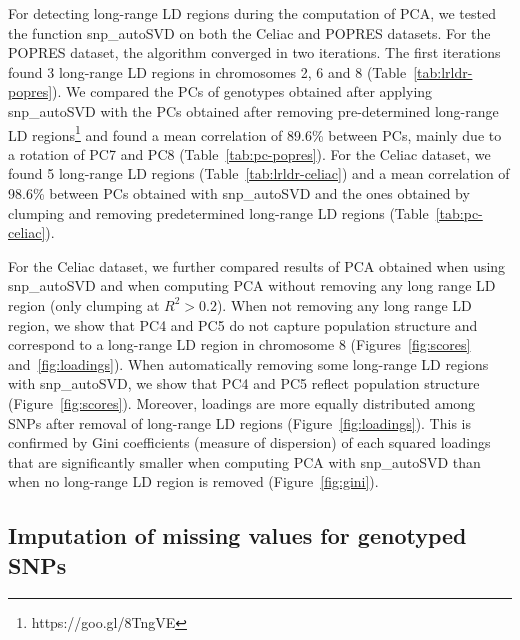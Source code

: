 \documentclass{bioinfo}
\begin{document}
For detecting long-range LD regions during the computation of PCA, we tested the function snp\_autoSVD on both the Celiac and POPRES datasets. For the POPRES dataset, the algorithm converged in two iterations. The first iterations found 3 long-range LD regions in chromosomes 2, 6 and 8 (Table~\ref{tab:lrldr-popres}). 
We compared the PCs of genotypes obtained after applying snp\_autoSVD with the PCs obtained after removing pre-determined long-range LD regions\footnote{https://goo.gl/8TngVE} and found a mean correlation of 89.6\% between PCs, mainly due to a rotation of PC7 and PC8 (Table~\ref{tab:pc-popres}). 
For the Celiac dataset, we found 5 long-range LD regions (Table~\ref{tab:lrldr-celiac}) and a mean correlation of 98.6\% between PCs obtained with snp\_autoSVD and the ones obtained by clumping and removing predetermined long-range LD regions (Table~\ref{tab:pc-celiac}).

For the Celiac dataset, we further compared results of PCA obtained when using snp\_autoSVD and when computing PCA without removing any long range LD region (only clumping at $R^2 > 0.2$). 
When not removing any long range LD region, we show that PC4 and PC5 do not capture population structure and correspond to a long-range LD region in chromosome 8 (Figures~\ref{fig:scores} and~\ref{fig:loadings}). 
When automatically removing some long-range LD regions with snp\_autoSVD, we show that PC4 and PC5 reflect population structure (Figure~\ref{fig:scores}). Moreover, loadings are more equally distributed among SNPs after removal of long-range LD regions (Figure~\ref{fig:loadings}). 
This is confirmed by Gini coefficients (measure of dispersion) of each squared loadings that are significantly smaller when computing PCA with snp\_autoSVD than when no long-range LD region is removed (Figure~\ref{fig:gini}).

\subsection{Imputation of missing values for genotyped SNPs}\label{sec:impute}
\end{document}
